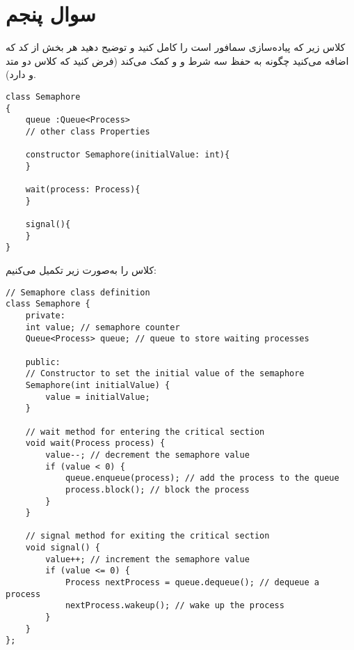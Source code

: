 \section{سوال پنجم}

کلاس زیر که پیاده‌سازی سمافور است را کامل کنید و توضیح دهید هر بخش از کد که اضافه می‌کنید چگونه به حفظ سه شرط  و  و  کمک می‌کند (فرض کنید که کلاس  دو متد  و  دارد).


\begin{latin}
\begin{lstlisting}[caption=Code of Q5, label=cpp_code_example]
class Semaphore 
{
	queue :Queue<Process>
	// other class Properties
	
	constructor Semaphore(initialValue: int){
	}
	
	wait(process: Process){
	}
	
	signal(){
	}
}
\end{lstlisting}
\end{latin}




\begin{qsolve}
	کلاس را به‌صورت زیر تکمیل می‌کنیم:
\end{qsolve}

\begin{latin}
\begin{lstlisting}[caption=Complete code of Q5, label=cpp_code_example]
// Semaphore class definition
class Semaphore {
	private:
	int value; // semaphore counter
	Queue<Process> queue; // queue to store waiting processes
	
	public:
	// Constructor to set the initial value of the semaphore
	Semaphore(int initialValue) {
		value = initialValue;
	}
	
	// wait method for entering the critical section
	void wait(Process process) {
		value--; // decrement the semaphore value
		if (value < 0) {
			queue.enqueue(process); // add the process to the queue
			process.block(); // block the process
		}
	}
	
	// signal method for exiting the critical section
	void signal() {
		value++; // increment the semaphore value
		if (value <= 0) {
			Process nextProcess = queue.dequeue(); // dequeue a process
			nextProcess.wakeup(); // wake up the process
		}
	}
};
\end{lstlisting}
\end{latin}


